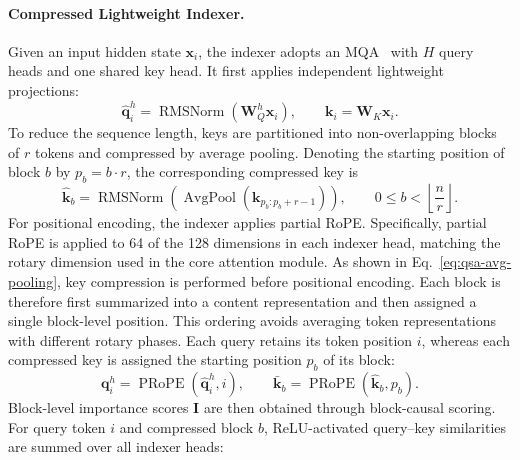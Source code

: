 \paragraph{Compressed Lightweight Indexer.}
Given an input hidden state $\mathbf{x}_i$, the indexer adopts an MQA~\citep{shazeer2019fast} with $H$ query heads and one shared key head.
It first applies independent lightweight projections:
\begin{equation}
    \widehat{\mathbf{q}}^h_i
    = \operatorname{RMSNorm}(\mathbf{W}^h_Q\mathbf{x}_i),
    \qquad
    \mathbf{k}_i=\mathbf{W}_K\mathbf{x}_i.
\end{equation}
To reduce the sequence length, keys are partitioned into non-overlapping blocks of $r$ tokens and compressed by average pooling.
Denoting the starting position of block $b$ by $p_b=b\cdot r$, the corresponding compressed key is
\begin{equation}
    \widehat{\mathbf{k}}_b
    = \operatorname{RMSNorm}\left(
        \operatorname{AvgPool}
        (\mathbf{k}_{p_b:p_b+r-1})
      \right),
    \qquad
    0\le b<\left\lfloor\frac{n}{r}\right\rfloor.
    \label{eq:qsa-avg-pooling}
\end{equation}
For positional encoding, the indexer applies partial RoPE.
Specifically, partial RoPE is applied to 64 of the 128 dimensions in each indexer head, matching the rotary dimension used in the core attention module. 
As shown in Eq.~\eqref{eq:qsa-avg-pooling}, key compression is performed before positional encoding.
Each block is therefore first summarized into a content representation and then assigned a single block-level position.
This ordering avoids averaging token representations with different rotary phases.
Each query retains its token position $i$, whereas each compressed key is assigned the starting position $p_b$ of its block:
\begin{equation}
    \mathbf{q}_i^h
    = \operatorname{PRoPE}(\widehat{\mathbf{q}}_i^h, i),
    \qquad
    \bar{\mathbf{k}}_b
    = \operatorname{PRoPE}(\widehat{\mathbf{k}}_b, p_b).
    \label{eq:qsa-partial-rope}
\end{equation}
Block-level importance scores $\mathbf{I}$ are then obtained through
block-causal scoring.
For query token $i$ and compressed block $b$,
ReLU-activated query--key similarities are summed over all indexer heads:
